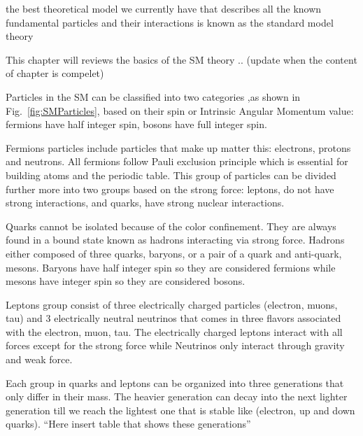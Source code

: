 
the best theoretical model we currently have that describes all the known fundamental particles and their interactions is known as the standard model theory 

This chapter will reviews the basics of the SM theory .. (update when the content of chapter is compelet)


Particles in the SM can be classified into two categories ,as shown in Fig.~\ref{fig:SMParticles}, based on their spin or Intrinsic Angular Momentum value: fermions have half integer spin, bosons have full integer spin.

Fermions particles include particles that make up matter this: electrons, protons and neutrons. All fermions follow Pauli exclusion principle which is essential for building atoms and the periodic table. This group of particles can be divided further more into two groups based on the strong force: leptons, do not have strong interactions, and quarks, have strong nuclear interactions.

Quarks cannot be isolated because of the color confinement. They are always found in a bound state known as hadrons interacting via strong force. Hadrons either composed of three quarks, baryons, or a pair of a quark and anti-quark, mesons. Baryons have half integer spin so they are considered fermions while mesons have integer spin so they are considered bosons.

Leptons group consist of three electrically charged particles (electron, muons, tau) and 3 electrically neutral neutrinos that comes in three flavors associated with the electron, muon, tau. The electrically charged leptons interact with all forces except for the strong force while Neutrinos only interact through gravity and weak force.

Each group in quarks  and leptons can be organized into three generations that only differ in their mass. The heavier generation can decay into the next lighter generation till we reach the lightest one that is stable like (electron, up and  down quarks). “Here insert table that shows these generations”

